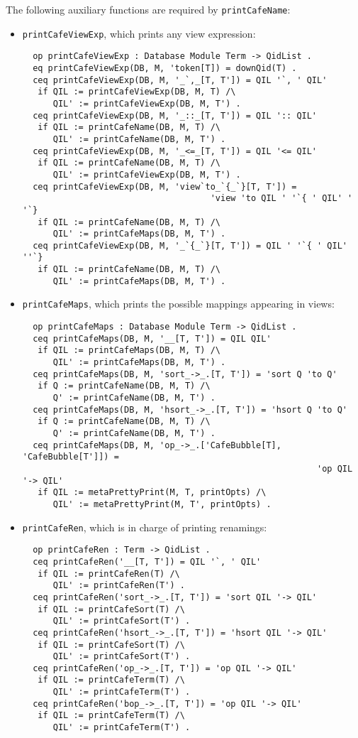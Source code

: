 The following auxiliary functions are required by \texttt{printCafeName}:
\begin{itemize}
\item
\verb"printCafeViewExp", which prints any view expression:

{\codesize
\begin{verbatim}
  op printCafeViewExp : Database Module Term -> QidList .
  eq printCafeViewExp(DB, M, 'token[T]) = downQid(T) .
  ceq printCafeViewExp(DB, M, '_`,_[T, T']) = QIL '`, ' QIL'
   if QIL := printCafeViewExp(DB, M, T) /\
      QIL' := printCafeViewExp(DB, M, T') .
  ceq printCafeViewExp(DB, M, '_::_[T, T']) = QIL ':: QIL'
   if QIL := printCafeName(DB, M, T) /\
      QIL' := printCafeName(DB, M, T') .
  ceq printCafeViewExp(DB, M, '_<=_[T, T']) = QIL '<= QIL'
   if QIL := printCafeName(DB, M, T) /\
      QIL' := printCafeViewExp(DB, M, T') .
  ceq printCafeViewExp(DB, M, 'view`to_`{_`}[T, T']) =
                                     'view 'to QIL ' '`{ ' QIL' ' '`}
   if QIL := printCafeName(DB, M, T) /\
      QIL' := printCafeMaps(DB, M, T') .
  ceq printCafeViewExp(DB, M, '_`{_`}[T, T']) = QIL ' '`{ ' QIL' ''`}
   if QIL := printCafeName(DB, M, T) /\
      QIL' := printCafeMaps(DB, M, T') .
\end{verbatim}
}

\item
\verb"printCafeMaps", which prints the possible mappings appearing in views:

{\codesize
\begin{verbatim}
  op printCafeMaps : Database Module Term -> QidList .
  ceq printCafeMaps(DB, M, '__[T, T']) = QIL QIL'
   if QIL := printCafeMaps(DB, M, T) /\
      QIL' := printCafeMaps(DB, M, T') .
  ceq printCafeMaps(DB, M, 'sort_->_.[T, T']) = 'sort Q 'to Q'
   if Q := printCafeName(DB, M, T) /\
      Q' := printCafeName(DB, M, T') .
  ceq printCafeMaps(DB, M, 'hsort_->_.[T, T']) = 'hsort Q 'to Q'
   if Q := printCafeName(DB, M, T) /\
      Q' := printCafeName(DB, M, T') .
  ceq printCafeMaps(DB, M, 'op_->_.['CafeBubble[T], 'CafeBubble[T']]) =
                                                          'op QIL '-> QIL'
   if QIL := metaPrettyPrint(M, T, printOpts) /\
      QIL' := metaPrettyPrint(M, T', printOpts) .
\end{verbatim}
}

\item
\verb"printCafeRen", which is in charge of printing renamings:

{\codesize
\begin{verbatim}
  op printCafeRen : Term -> QidList .
  ceq printCafeRen('__[T, T']) = QIL '`, ' QIL'
   if QIL := printCafeRen(T) /\
      QIL' := printCafeRen(T') .
  ceq printCafeRen('sort_->_.[T, T']) = 'sort QIL '-> QIL'
   if QIL := printCafeSort(T) /\
      QIL' := printCafeSort(T') .
  ceq printCafeRen('hsort_->_.[T, T']) = 'hsort QIL '-> QIL'
   if QIL := printCafeSort(T) /\
      QIL' := printCafeSort(T') .
  ceq printCafeRen('op_->_.[T, T']) = 'op QIL '-> QIL'
   if QIL := printCafeTerm(T) /\
      QIL' := printCafeTerm(T') .
  ceq printCafeRen('bop_->_.[T, T']) = 'op QIL '-> QIL'
   if QIL := printCafeTerm(T) /\
      QIL' := printCafeTerm(T') .
\end{verbatim}
}


\end{itemize}
